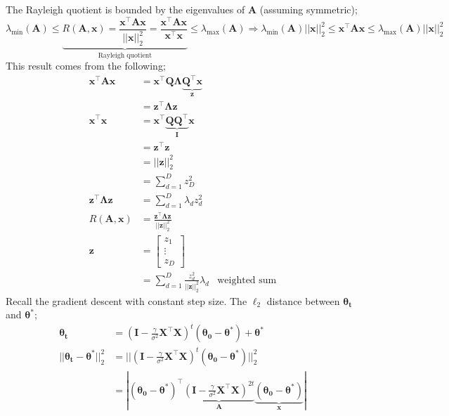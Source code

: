 \documentclass[a4paper, 12pt]{article}
\newcommand{\summation}[2]{\sum\limits_{#1}^{#2}}
\newcommand{\mat}[1]{\boldsymbol{#1}}
\renewcommand{\vec}[1]{\boldsymbol{#1}}
\begin{document}
            The Rayleigh quotient is bounded by the eigenvalues of $\mat{A}$ (assuming symmetric);
            $$\lambda_\text{min}(\mat{A}) \leq \underbrace{R(\mat{A}, \vec{x}) = \frac{\vec{x}^\top\mat{A}\vec{x}}{|| \vec{x} ||_2^2} = \frac{\vec{x}^\top\mat{A}\vec{x}}{\vec{x}^\top\vec{x}}}_\text{Rayleigh quotient} \leq \lambda_\text{max}(\mat{A}) \Rightarrow \lambda_\text{min}(\mat{A})|| \vec{x} ||_2^2 \leq \vec{x}^\top\mat{A}\vec{x} \leq \lambda_\text{max}(\mat{A})|| \vec{x} ||_2^2$$
            This result comes from the following;
            \begin{align*}
                \vec{x}^\top\mat{A}\vec{x} & = \vec{x}^\top\mat{Q}\mat{\Lambda}\underbrace{\mat{Q}^\top\vec{x}}_{\vec{z}} \\
                & = \vec{z}^\top\mat{\Lambda}\vec{z} \\
                \vec{x}^\top\vec{x} & = \vec{x}^\top\underbrace{\mat{Q}\mat{Q}^\top}_{\mat{I}}\vec{x} \\
                & = \vec{z}^\top\vec{z} \\
                & = || \vec{z} ||_2^2 \\
                & = \summation{d = 1}{D} z_D^2 \\
                \vec{z}^\top\mat{\Lambda}\vec{z} & = \summation{d = 1}{D} \lambda_d z_d^2 \\
                R(\mat{A}, \vec{x}) & = \frac{\vec{z}^\top\mat{\Lambda}\vec{z}}{|| \vec{z} ||_2^2} \\
                \vec{z} & = \begin{bmatrix}
                    z_1 \\ \vdots \\ z_D
                \end{bmatrix} \\
                & = \summation{d = 1}{D} \frac{z_d^2}{|| \vec{z} ||_2^2} \lambda_d & \text{weighted sum}
            \end{align*}
            Recall the gradient descent with constant step size.
            The $\ell_2$ distance between $\vec{\theta_t}$ and $\vec{\theta^*}$;
            \begin{align*}
                \mat{\theta_t} & = (\mat{I} - \frac{\gamma}{\sigma^2}\mat{X}^\top\mat{X})^t(\mat{\theta_0} - \mat{\theta^*}) + \mat{\theta^*} \\
                || \mat{\theta_t} - \mat{\theta^*} ||_2^2 & = || (\mat{I} - \frac{\gamma}{\sigma^2}\mat{X}^\top\mat{X})^t(\mat{\theta_0} - \mat{\theta^*}) ||_2^2 \\
                & = | (\mat{\theta_0} - \mat{\theta^*})^\top \underbrace{(\mat{I} - \frac{\gamma}{\sigma^2}\mat{X}^\top\mat{X})^{2t}}_{\mat{A}} \underbrace{(\mat{\theta_0} - \mat{\theta^*})}_{\vec{x}} |
            \end{align*}
\end{document}
